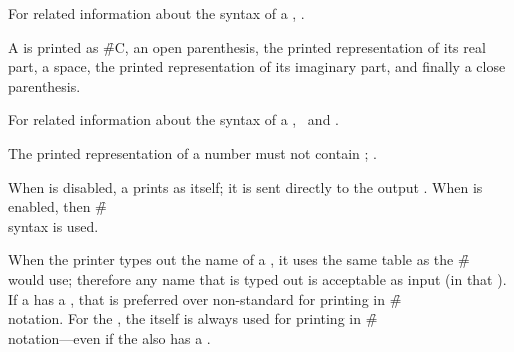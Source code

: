 For related information about the syntax of a ,
\seesection\SyntaxOfFloats.

\endsubsubsubsection%

A  is printed as \f{\#C}, an open parenthesis,
the printed representation of its real part, a space,
the printed representation of its imaginary part, and finally
a close parenthesis.

For related information about the syntax of a ,
\seesection\SyntaxOfComplexes\ and \secref\SharpsignC.

\endsubsubsubsection%

The printed representation of a number must not contain  ;
\seesection\EscCharsAndPotentialNums.

\endsubsubsubsection%
\endsubsubsection%

When  is disabled,
a  prints as itself;
it is sent directly to the output .
When  is enabled,
then \f{\#\\} syntax is used.

When the printer types out the name of a ,
it uses the same table as the \f{\#\\}  would use;
therefore any  name that is typed out
is acceptable as input (in that ).
If a   has a  ,
that  is preferred over non-standard 
for printing in \f{\#\\} notation.
For the  ,
the  itself is always used
for printing in \f{\#\\} notation---even if 
the  also has a .

